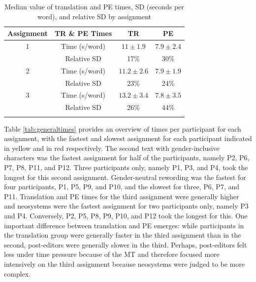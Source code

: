 \begin{table}[ht]
\caption{Median value of translation and PE times, SD (seconds per word), and relative SD by assignment}
    \centering
    \small
    \begin{tabular}{cccc} \lsptoprule
   \textbf{Assignment} & \textbf{TR \& PE Times} & \textbf{TR}  & \textbf{PE}\\
\midrule
   1 & Time (s/word) & $11\pm 1.9$ & $7.9\pm 2.4$\\
     & Relative SD & 17\% & 30\% \\ \midrule
   2 & Time (s/word) & $11.2\pm 2.6$ & $7.9\pm 1.9$ \\
     & Relative SD & 23\% & 24\% \\ \midrule
   3 & Time (s/word) & $13.2\pm 3.4$ & $7.8\pm 3.5$ \\
     & Relative SD & 26\% & 44\% \\
\lspbottomrule
    \end{tabular}
    \label{tab:normalisedtimes}
\end{table}

Table \ref{tab:generaltimes} provides an overview of times per participant for each assignment, with the fastest and slowest assignment for each participant indicated in yellow and in red respectively. The second text with gender-inclusive characters was the fastest assignment for half of the participants, namely P2, P6, P7, P8, P11, and P12. Three participants only, namely P1, P3, and P4, took the longest for this second assignment. Gender-neutral rewording was the fastest for four participants, P1, P5, P9, and P10, and the slowest for three, P6, P7, and P11. Translation and PE times for the third assignment were generally higher and neosystems were the fastest assignment for two participants only, namely P3 and P4. Conversely, P2, P5, P8, P9, P10, and P12 took the longest for this. One important difference between translation and PE emerges: while participants in the translation group were generally faster in the third assignment than in the second, post-editors were generally slower in the third. Perhaps, post-editors felt less under time pressure because of the MT and therefore focused more intensively on the third assignment because neosystems were judged to be more complex.

